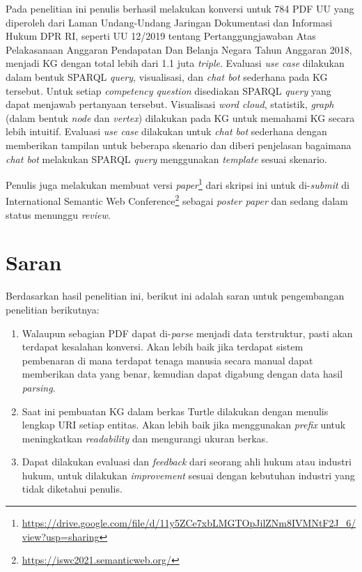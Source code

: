 Pada penelitian ini penulis berhasil melakukan konversi untuk 784 PDF UU yang diperoleh dari Laman
Undang-Undang Jaringan Dokumentasi dan Informasi Hukum DPR RI, seperti UU 12/2019 tentang
Pertanggungjawaban Atas Pelakasanaan Anggaran Pendapatan Dan Belanja Negara Tahun Anggaran 2018,
menjadi KG dengan total lebih dari 1.1 juta \textit{triple}. Evaluasi \textit{use case} dilakukan
dalam bentuk SPARQL \textit{query}, visualisasi, dan \textit{chat bot} sederhana pada KG tersebut.
Untuk setiap \textit{competency question} disediakan SPARQL \textit{query} yang dapat menjawab
pertanyaan tersebut. Visualisasi \textit{word cloud}, statistik, \textit{graph} (dalam bentuk
\textit{node} dan \textit{vertex}) dilakukan pada KG untuk memahami KG secara lebih intuitif.
Evaluasi \textit{use case} dilakukan untuk \textit{chat bot} sederhana dengan memberikan tampilan
untuk beberapa skenario dan diberi penjelasan bagaimana \textit{chat bot} melakukan SPARQL
\textit{query} menggunakan \textit{template} sesuai skenario.

Penulis juga melakukan membuat versi
\textit{paper}\footnote{\url{https://drive.google.com/file/d/11y5ZCe7xbLMGTOpJilZNm8IVMNtF2J_6/view?usp=sharing}}
dari skripsi ini untuk di-\textit{submit} di International Semantic Web
Conference\footnote{\url{https://iswc2021.semanticweb.org/}} sebagai \textit{poster paper} dan
sedang dalam status menunggu \textit{review}.

\section{Saran}
\label{sec:saran}
Berdasarkan hasil penelitian ini, berikut ini adalah saran untuk pengembangan penelitian berikutnya:
\begin{enumerate}
	\item Walaupun sebagian PDF dapat di-\textit{parse} menjadi data terstruktur, pasti akan terdapat
	      kesalahan konversi. Akan lebih baik jika terdapat sistem pembenaran di mana terdapat tenaga
	      manusia secara manual dapat memberikan data yang benar, kemudian dapat digabung dengan data
	      hasil \textit{parsing}.
	\item Saat ini pembuatan KG dalam berkas Turtle dilakukan dengan menulis lengkap URI setiap
	      entitas. Akan lebih baik jika menggunakan \textit{prefix} untuk meningkatkan \textit{readability}
	      dan mengurangi ukuran berkas.
	\item Dapat dilakukan evaluasi dan \textit{feedback} dari seorang ahli hukum atau industri hukum,
				untuk dilakukan \textit{improvement} sesuai dengan kebutuhan industri yang tidak diketahui
				penulis.
\end{enumerate}
